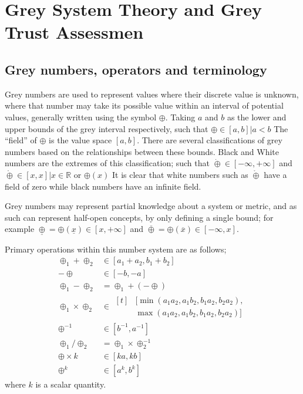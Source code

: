 
\chapter{Grey System Theory and Grey Trust Assessmen}
\label{apx:grey}

\section{Grey numbers, operators and terminology}
Grey numbers are used to represent values where their discrete value is unknown, where that number may take its possible value within an interval of potential values, generally written using the symbol $\oplus$.
Taking $a$ and $b$ as the lower and upper bounds of the grey interval respectively, such that $\oplus \in [a,b] | a < b$ 
The ``field'' of $\oplus$ is the value space $[a,b]$.
There are several classifications of grey numbers based on the relationships between these bounds.
Black and White numbers are the extremes of this classification; such that $\dot\oplus \in [-\infty, +\infty]$ and $\mathring\oplus \in [x, x] | x \in \mathbb{R}$ or $\oplus(x)$
It is clear that white numbers such as $\mathring\oplus$ have a field of zero while black numbers have an infinite field.

Grey numbers may represent partial knowledge about a system or metric, and as such can represent half-open concepts, by only defining a single bound; for example $\underline\oplus = \oplus(\underline x ) \in [x, +\infty]$ and $\overline\oplus = \oplus(\overline x) \in [-\infty, x]$.

Primary operations within this number system are as follows;
\begin{subequations}
  \begin{align}
    \oplus_1 + \oplus_2      &\in [a_1+a_2,b_1+b_2] \label{eq:grey_add}\\
    -\oplus         &\in [-b,-a] \label{eq:grey_neg} \\
    \oplus_1 - \oplus_2      &= \oplus_1+(-\oplus) \label{eq:grey_sub}\\
    \oplus_1 \times \oplus_2 &\in \begin{aligned}[t]
      &[\min(a_1 a_2, a_1 b_2, b_1 a_2, b_2 a_2), \\
      & \max(a_1 a_2, a_1 b_2, b_1 a_2, b_2 a_2)]
    \end{aligned} \label{eq:grey_mult}\\
    \oplus^{-1} &\in [b^{-1}, a^{-1}] \label{eq:grey_inv}\\
    \oplus_1 / \oplus_2 & = \oplus_1 \times \oplus_2^{-1} \label{eq:grey_div} \\
    \oplus \times k &\in [ka,kb] \label{eq:grey_times_scalar}\\
    \oplus^k &\in [a^k, b^k] \label{eq:grey_exp}
  \end{align}
\end{subequations}
where $k$ is a scalar quantity.

